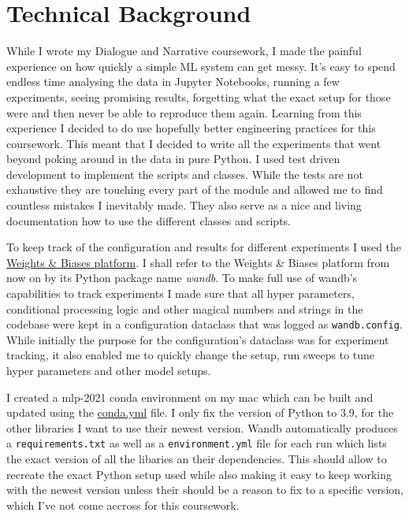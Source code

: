 \documentclass[a4paper]{article}
\begin{document}
    \section{Technical Background}\label{sec:technical-background}

    While I wrote my Dialogue and Narrative coursework, I made the painful experience on how quickly a
    simple ML system can get messy. It's
    easy to spend endless time analysing the data in Jupyter Notebooks, running a few experiments, seeing promising results,
    forgetting what the exact setup for those were and then never be able to reproduce them again. Learning from this
    experience I decided to do use hopefully better engineering practices for this coursework. This meant
    that I decided to write all the experiments that went beyond poking around in the data in pure Python. I used test
    driven development to implement the scripts and classes. While the tests are not exhaustive they are touching every
    part of the module and allowed me to find countless mistakes I inevitably made. They also serve as a nice and living
    documentation how to use the different classes and scripts.

    To keep track of the configuration and results for different experiments I used the
    \href{https://wandb.ai/site}{Weights \& Biases platform}\cite{wandb}.
    I shall refer to the Weights \& Biases platform from now on by its Python package name \textit{wandb}. To make full
    use of wandb's capabilities to track experiments I made sure that all hyper parameters,
    conditional processing logic and other magical numbers and strings in the codebase were kept in a configuration
    dataclass that was logged as \texttt{wandb.config}. While initially the purpose for the configuration's dataclass was for experiment
    tracking, it also enabled me to quickly change the setup, run sweeps to tune hyper parameters and other model setups.

    I created a mlp-2021 conda environment on my mac \cite{conda-forge} which can be built and updated using the
    \href{https://github.com/isabelladegen/mlp-2021/blob/main/conda.yml}{conda.yml} file. I only fix the version of Python to 3.9,
    for the other libraries I want to use their newest version. Wandb automatically produces a \texttt{requirements.txt}
    as well as a \texttt{environment.yml} file for each run which lists the exact version of all the libaries an their
    dependencies. This should allow to recreate the exact Python setup used while also making it easy to keep working with
    the newest version unless their should be a reason to fix to a specific version, which I've not come accross for this coursework.
\end{document}
